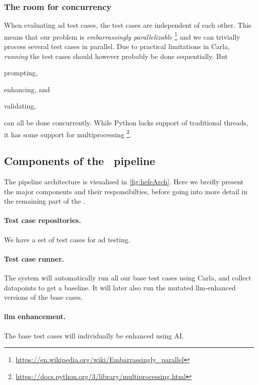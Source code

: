 \subsubsection{The room for concurrency}

When evaluating \acrshort{ad} test cases, the test cases are independent of each
other. This means that our problem is \textit{embarrassingly parallelizable}
\footnote{\url{https://en.wikipedia.org/wiki/Embarrassingly_parallel}} and we can
trivially process several test cases in parallel. Due to practical limitations
in Carla, \textit{running} the test cases should however probably be done
sequentially. But \begin{inparaenum}
    \item prompting,
    \item enhancing, and
    \item validating,
\end{inparaenum}
can all be done concurrently. While Python lacks support of traditional threads,
it has some support for multiprocessing
\footnote{\url{https://docs.python.org/3/library/multiprocessing.html}}.

\subsection{Components of the \hefe~pipeline}

The pipeline architecture is visualised in \cref{fig:hefeArch}. Here we breifly
present the major components and their responsibilties, before going into more
detail in the remaining part of the  .

\paragraph{Test case repositories.} We have a set of test cases for \acrshort{ad} testing.
\paragraph{Test case runner.} The system will automatically run all
our base test cases using Carla, and collect datapoints to get a baseline. It will later
also run the mutated \acrshort{llm}-enhanced versions of the base cases.
\paragraph{\acrshort{llm} enhancement.} The base test cases will
individually be enhanced using AI.
